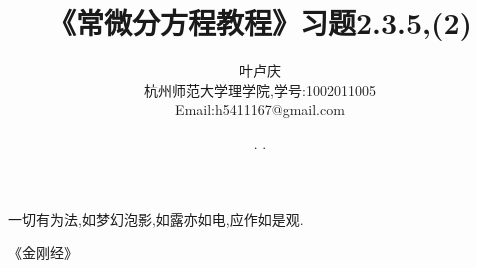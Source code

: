 \documentclass[a4paper, 12pt]{article} %
\makeatletter
\renewcommand{\maketitle}{ %
  \renewcommand\refname{参考文献}
  \newcommand{\D}{\displaystyle}\newcommand{\ri}{\Rightarrow}
  \newcommand{\ds}{\displaystyle} \renewcommand{\ni}{\noindent}
  \newcommand{\pa}{\partial} \newcommand{\Om}{\Omega}
  \newcommand{\om}{\omega} \newcommand{\sik}{\sum_{i=1}^k}
  \newcommand{\vov}{\Vert\omega\Vert} \newcommand{\Umy}{U_{\mu_i,y^i}}
  \newcommand{\lamns}{\lambda_n^{^{\scriptstyle\sigma}}}
  \newcommand{\chiomn}{\chi_{_{\Omega_n}}}
  \newcommand{\ullim}{\underline{\lim}} \newcommand{\bsy}{\boldsymbol}
  \newcommand{\mvb}{\mathversion{bold}} \newcommand{\la}{\lambda}
  \newcommand{\La}{\Lambda} \newcommand{\va}{\varepsilon}
  \newcommand{\be}{\beta} \newcommand{\al}{\alpha}
  \newcommand{\dis}{\displaystyle} \newcommand{\R}{{\mathbb R}}
  \newcommand{\N}{{\mathbb N}} \newcommand{\cF}{{\mathcal F}}
  \newcommand{\gB}{{\mathfrak B}} \newcommand{\eps}{\epsilon}
  \begin{flushright} %
    {\LARGE\@title} %
    
    \vspace{50pt} %
    
    {\large\@author} %
    \\\@date %
    
    \vspace{40pt} %
  \end{flushright}
}
\makeatother
\begin{document}
\title{\textbf{《常微分方程教程》习题2.3.5,(2)}} 
\author{\small{叶卢庆}\\{\small{杭州师范大学理学院,学号:1002011005}}\\{\small{Email:h5411167@gmail.com}}} %
\renewcommand{\today}{\number\year. \number\month. \number\day}
\date{\today} %
\setlength{}
\epigraph{一切有为法,如梦幻泡影,如露亦如电,应作如是观.}{《金刚经》}


\maketitle %






\end{document}

